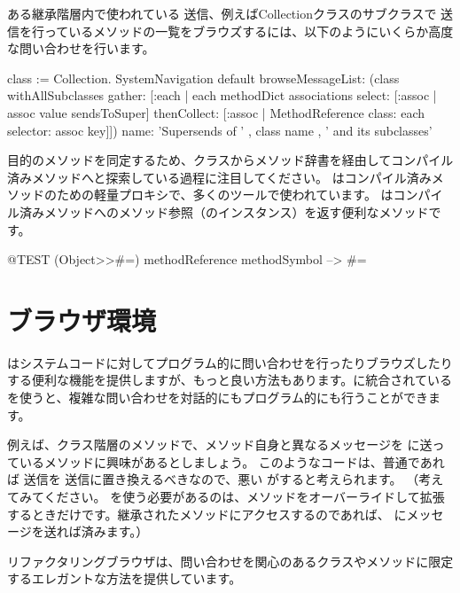 \documentclass[a4paper,10pt,twoside]{book}
\begin{document}
ある継承階層内で使われている \super 送信、例えばCollectionクラスのサブクラスで \super 送信を行っているメソッドの一覧をブラウズするには、以下のようにいくらか高度な問い合わせを行います。
\begin{code}{}
class := Collection.
SystemNavigation default
  browseMessageList: (class withAllSubclasses gather: [:each |
    each methodDict associations
      select: [:assoc | assoc value sendsToSuper]
      thenCollect: [:assoc | MethodReference class: each selector: assoc key]])
  name: 'Supersends of ' , class name , ' and its subclasses'
\end{code}
目的のメソッドを同定するため、クラスからメソッド辞書を経由してコンパイル済みメソッドへと探索している過程に注目してください。
はコンパイル済みメソッドのための軽量プロキシで、多くのツールで使われています。
はコンパイル済みメソッドへのメソッド参照（のインスタンス）を返す便利なメソッドです。
\begin{code}{@TEST}
(Object>>#=) methodReference methodSymbol --> #=
\end{code}

\section{ブラウザ環境}

はシステムコードに対してプログラム的に問い合わせを行ったりブラウズしたりする便利な機能を提供しますが、もっと良い方法もあります。\pharo に統合されているを使うと、複雑な問い合わせを対話的にもプログラム的にも行うことができます。

例えば、クラス階層のメソッドで、メソッド自身と異なるメッセージを \super に送っているメソッドに興味があるとしましょう。
このようなコードは、普通であれば \super 送信を \self 送信に置き換えるべきなので、悪い  がすると考えられます。 （考えてみてください。 \super を使う必要があるのは、メソッドをオーバーライドして拡張するときだけです。継承されたメソッドにアクセスするのであれば、 \self にメッセージを送れば済みます。）

リファクタリングブラウザは、問い合わせを関心のあるクラスやメソッドに限定するエレガントな方法を提供しています。

\end{document}
